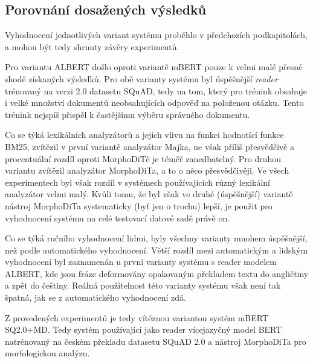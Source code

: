 \subsection{Porovnání dosažených výsledků}
Vyhodnocení jednotlivých variant systému proběhlo v předchozích podkapitolách, a mohou být tedy shrnuty závěry experimentů. \par
Pro variantu ALBERT došlo oproti variantě mBERT pouze k velmi malé přesné shodě získaných výsledků. Pro obě varianty systému byl úspěšnější \emph{reader} trénovaný na verzi 2.0 datasetu SQuAD, tedy na tom, který pro trénink obsahuje i velké množství dokumentů neobsahujících odpověď na položenou otázku. Tento trénink nejspíš přispěl k častějšímu výběru správného dokumentu.\par
Co se týká lexikálních analyzátorů a jejich vlivu na funkci hodnotící funkce BM25, zvítězil v první variantě analyzátor Majka, ne však příliš přesvědčivě a procentuální rozdíl oproti MorphoDiTě je téměř zanedbatelný. Pro druhou variantu zvítězil analyzátor MorphoDiTa, a to o něco přesvědčivěji. Ve všech experimentech byl však rozdíl v systémech používajících různý lexikální analyzátor velmi malý. Kvůli tomu, že byl však ve druhé (úspěšnější) variantě nástroj MorphoDiTa systematicky (byť jen o trochu) lepší, je použit pro vyhodnocení systému na celé testovací datové sadě právě on.\par
Co se týká ručního vyhodnocení lidmi, byly všechny varianty mnohem úspěšnější, než podle automatického vyhodnocení. Větší rozdíl mezi automatickým a lidským vyhodnocení byl zaznamenán u první varianty systému s reader modelem ALBERT, kde jsou fráze deformovány opakovaným překladem textu do angličtiny a zpět do češtiny. Reálná použitelnost této varianty systému však není tak špatná, jak se z automatického vyhodnocení zdá.\par
Z provedených experimentů je tedy vítěznou variantou systém mBERT SQ2.0+MD. Tedy systém používající jako reader vícejazyčný model BERT natrénovaný na českém překladu datasetu SQuAD 2.0 a nástroj MorphoDiTa pro morfologickou analýzu.

